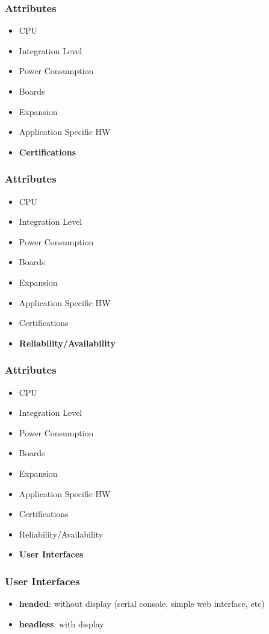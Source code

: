 \begin{frame}
  \frametitle{Attributes}
  \begin{itemize}
    \item CPU
    \item Integration Level
    \item Power Consumption
    \item Boards
    \item Expansion
    \item Application Specific HW
    \item {\bf Certifications}
  \end{itemize}
\end{frame}

\begin{frame}
  \frametitle{Attributes}
  \begin{itemize}
    \item CPU
    \item Integration Level
    \item Power Consumption
    \item Boards
    \item Expansion
    \item Application Specific HW
    \item Certifications
    \item {\bf Reliability/Availability}
  \end{itemize}
\end{frame}

\begin{frame}
  \frametitle{Attributes}
  \begin{itemize}
    \item CPU
    \item Integration Level
    \item Power Consumption
    \item Boards
    \item Expansion
    \item Application Specific HW
    \item Certifications
    \item Reliability/Availability
    \item {\bf User Interfaces}
  \end{itemize}
\end{frame}

\begin{frame}
  \frametitle{User Interfaces}
  \begin{itemize}
    \item {\bf headed}: without display (serial console, simple web interface, etc)
    \item {\bf headless}: with display
  \end{itemize}
\end{frame}

